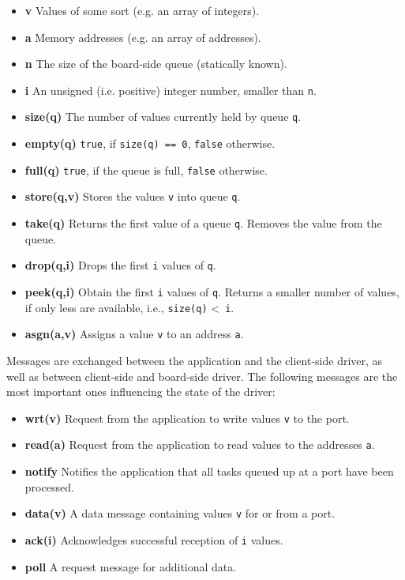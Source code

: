 \documentclass{report}
\begin{document}
\begin{itemize} \itemsep1pt \parskip0pt 
  \item \textbf{v} Values of some sort (e.g. an array of integers).
  \item \textbf{a} Memory addresses (e.g. an array of addresses).
  \item \textbf{n} The size of the board-side queue (statically known).
  \item \textbf{i} An unsigned (i.e. positive) integer number, smaller than \texttt{n}.\\

  \item \textbf{size(q)} The number of values currently held by queue \texttt{q}.
  \item \textbf{empty(q)} \texttt{true}, if \texttt{size(q) == 0}, \texttt{false} otherwise.
  \item \textbf{full(q)} \texttt{true}, if the queue is full, \texttt{false} otherwise.
  \item \textbf{store(q,v)} Stores the values \texttt{v} into queue \texttt{q}.
  \item \textbf{take(q)} Returns the first value of a queue \texttt{q}. Removes the value from the queue.
  \item \textbf{drop(q,i)} Drops the first \texttt{i} values of \texttt{q}.
  \item \textbf{peek(q,i)} Obtain the first \texttt{i} values of \texttt{q}. Returns a smaller number of values, if only less are available, i.e., \texttt{size(q)} \textless ~\texttt{i}.
  \item \textbf{asgn(a,v)} Assigns a value \texttt{v} to an address  \texttt{a}.
\end{itemize}

Messages are exchanged between the application and the client-side driver, as well as between client-side and board-side driver. The following messages are the most important ones influencing the state of the driver:
\begin{itemize} \itemsep1pt \parskip0pt 
  \item \textbf{wrt(v)} Request from the application to write values \texttt{v} to the port.
  \item \textbf{read(a)} Request from the application to read values to the addresses \texttt{a}.
  \item \textbf{notify} Notifies the application that all tasks queued up at a port have been processed.
  \item \textbf{data(v)} A data message containing values \texttt{v} for or from a port.
  \item \textbf{ack(i)} Acknowledges successful reception of \texttt{i} values.
  \item \textbf{poll} A request message for additional data.
\end{itemize}
\end{document}
